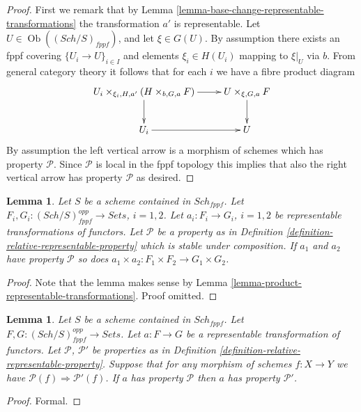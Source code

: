 \documentclass{stacks-project}
\theoremstyle{plain}
\newtheorem{lemma}[subsection]{Lemma}
\theoremstyle{definition}
\theoremstyle{remark}
\numberwithin{equation}{subsection}
\def\Sch{\mathit{Sch}}
\def\Ob{\mathop{\mathrm{Ob}}\nolimits}
\begin{document}
\begin{proof}
First we remark that by
Lemma \ref{lemma-base-change-representable-transformations}
the transformation $a'$ is representable.
Let $U \in \Ob((\Sch/S)_{fppf})$, and let
$\xi \in G(U)$. By assumption there exists an fppf covering
$\{U_i \to U\}_{i \in I}$ and elements $\xi_i \in H(U_i)$ mapping
to $\xi|_U$ via $b$. From general category theory it follows that for
each $i$ we have a fibre product diagram
$$
\xymatrix{
U_i \times_{\xi_i, H, a'} (H \times_{b, G, a} F) \ar[r] \ar[d] &
U \times_{\xi, G, a} F \ar[d] \\
U_i \ar[r] & U
}
$$
By assumption the left vertical arrow is a morphism of schemes which
has property $\mathcal{P}$. Since $\mathcal{P}$ is local in the fppf
topology this implies that also the right vertical arrow has property
$\mathcal{P}$ as desired.
\end{proof}

\begin{lemma}
\label{lemma-product-representable-transformations-property}
Let $S$ be a scheme contained in $\Sch_{fppf}$.
Let $F_i, G_i : (\Sch/S)_{fppf}^{opp} \to \textit{Sets}$,
$i = 1, 2$.
Let $a_i : F_i \to G_i$, $i = 1, 2$ be representable transformations
of functors.
Let $\mathcal{P}$ be a property as in
Definition \ref{definition-relative-representable-property}
which is stable under composition.
If $a_1$ and $a_2$ have property $\mathcal{P}$ so does
$a_1 \times a_2 : F_1 \times F_2 \longrightarrow G_1 \times G_2$.
\end{lemma}

\begin{proof}
Note that the lemma makes sense by
Lemma \ref{lemma-product-representable-transformations}.
Proof omitted.
\end{proof}

\begin{lemma}
\label{lemma-representable-transformations-property-implication}
Let $S$ be a scheme contained in $\Sch_{fppf}$.
Let $F, G : (\Sch/S)_{fppf}^{opp} \to \textit{Sets}$.
Let $a : F \to G$ be a representable transformation of functors.
Let $\mathcal{P}$, $\mathcal{P}'$ be properties as in
Definition \ref{definition-relative-representable-property}.
Suppose that for any morphism of schemes $f : X \to Y$
we have $\mathcal{P}(f) \Rightarrow \mathcal{P}'(f)$.
If $a$ has property $\mathcal{P}$ then
$a$ has property $\mathcal{P}'$.
\end{lemma}

\begin{proof}
Formal.
\end{proof}
\end{document}
